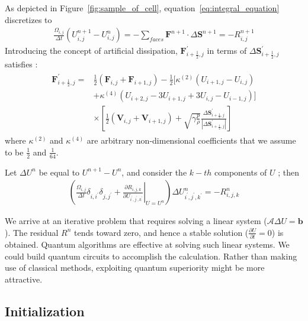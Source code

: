 \documentclass[%
 reprint,
 amsmath,amssymb,
pra,
]{revtex4-1}
\begin{document}
As depicted in Figure~\ref{fig:sample_of_cell}, equation~\ref{eq:integral_equation} discretizes to
\begin{align}
  \frac{\Omega_{i, j}}{\Delta t}\left(U^{n+1}_{i, j}-U^{n}_{i, j} \right) = -\sum_{faces}\bm{F}^{n+1}\cdot\Delta\bm{S}^{n+1} = -R^{n+1}_{i, j}
\end{align}
Introducing the concept of artificial dissipation, $\bm{F}^\prime_{i+\frac{1}{2}, j}$ in terms of $\Delta\bm{S}^\prime_{i+\frac{1}{2}, j}$ satisfies \cite{hirsch2007numerical} \cite{jameson1981numerical}:
\begin{align}
\begin{split}
    \bm{F}^\prime_{i+\frac{1}{2},j} =& \frac{1}{2}\left(\bm{F}_{i,j} + \bm{F}_{i+1, j}\right)
    - \frac{1}{2}\big[\kappa^{\left(2\right)}\left(U_{i+1, j}-U_{i, j}\right)\\
    &+\kappa^{\left(4\right)}\left(U_{i+2, j}-3 U_{i+1, j}+3 U_{i, j}-U_{i-1, j}\right)\big]\\
    &\times\left[\frac{1}{2}\left(\bm{V}_{i, j} + \bm{V}_{i + 1, j}\right) 
    + \sqrt{\gamma \frac{p}{\rho}}\frac{\Delta\bm{S}^\prime_{i+\frac{1}{2}, j}}
{\left|\Delta\bm{S}^\prime_{i+\frac{1}{2}, j}\right|}\right]
\end{split}
\end{align}
where $\kappa^{\left(2\right)}$ and $\kappa^{\left(4\right)}$ are arbitrary non-dimensional coefficients that we assume to be $\frac{1}{2}$ and $\frac{1}{64}$.

Let $\Delta U^{n}$ be equal to $U^{n+1}-U^{n}$, and consider the $k-th$ components of $U$ \cite{economon2016su2}; then
\begin{align}
\left(\frac{\Omega_{i, j}}{\Delta t}\delta_{i, i^\prime}\delta_{j, j^\prime}
+\left.\frac{\partial R_{i,j,k}}{\partial U_{i^\prime,j^\prime,k^\prime}}\right|_{U=U^n}\right) \Delta U^{n}_{i^\prime,j^\prime,k^\prime} = -R^{n}_{i,j,k}
\end{align}

We arrive at an iterative problem that requires solving a linear system ($\mathcal{A} \Delta U = \bm{b}$). The residual $R^{n}$ tends toward zero, and hence a stable solution ($\frac{\partial U}{\partial t} = 0$) is obtained. Quantum algorithms are effective at solving such linear systems. We could build quantum circuits to accomplish the calculation. Rather than making use of classical methods, exploiting quantum superiority might be more attractive.

\subsection{Initialization}
\end{document}
